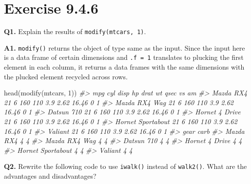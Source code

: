 \documentclass[
]{book}
\newenvironment{Shaded}{\begin{snugshade}}{\end{snugshade}}
\newcommand{\CommentTok}[1]{\textcolor[rgb]{0.56,0.35,0.01}{\textit{#1}}}
\newcommand{\DecValTok}[1]{\textcolor[rgb]{0.00,0.00,0.81}{#1}}
\newcommand{\FunctionTok}[1]{\textcolor[rgb]{0.00,0.00,0.00}{#1}}
\newcommand{\NormalTok}[1]{#1}
\newcommand{\OtherTok}[1]{\textcolor[rgb]{0.56,0.35,0.01}{#1}}
\newcommand{\SpecialCharTok}[1]{\textcolor[rgb]{0.00,0.00,0.00}{#1}}
\newcommand{\StringTok}[1]{\textcolor[rgb]{0.31,0.60,0.02}{#1}}
\begin{document}
\hypertarget{exercise-9.4.6}{%
\section{Exercise 9.4.6}\label{exercise-9.4.6}}

\textbf{Q1.} Explain the results of \texttt{modify(mtcars,\ 1)}.

\textbf{A1.} \texttt{modify()} returns the object of type same as the input. Since the input here is a data frame of certain dimensions and \texttt{.f\ =\ 1} translates to plucking the first element in each column, it returns a data frames with the same dimensions with the plucked element recycled across rows.

\begin{Shaded}
\begin{Highlighting}[]
\FunctionTok{head}\NormalTok{(}\FunctionTok{modify}\NormalTok{(mtcars, }\DecValTok{1}\NormalTok{))}
\CommentTok{\#\textgreater{}                   mpg cyl disp  hp drat   wt  qsec vs am}
\CommentTok{\#\textgreater{} Mazda RX4          21   6  160 110  3.9 2.62 16.46  0  1}
\CommentTok{\#\textgreater{} Mazda RX4 Wag      21   6  160 110  3.9 2.62 16.46  0  1}
\CommentTok{\#\textgreater{} Datsun 710         21   6  160 110  3.9 2.62 16.46  0  1}
\CommentTok{\#\textgreater{} Hornet 4 Drive     21   6  160 110  3.9 2.62 16.46  0  1}
\CommentTok{\#\textgreater{} Hornet Sportabout  21   6  160 110  3.9 2.62 16.46  0  1}
\CommentTok{\#\textgreater{} Valiant            21   6  160 110  3.9 2.62 16.46  0  1}
\CommentTok{\#\textgreater{}                   gear carb}
\CommentTok{\#\textgreater{} Mazda RX4            4    4}
\CommentTok{\#\textgreater{} Mazda RX4 Wag        4    4}
\CommentTok{\#\textgreater{} Datsun 710           4    4}
\CommentTok{\#\textgreater{} Hornet 4 Drive       4    4}
\CommentTok{\#\textgreater{} Hornet Sportabout    4    4}
\CommentTok{\#\textgreater{} Valiant              4    4}
\end{Highlighting}
\end{Shaded}

\textbf{Q2.} Rewrite the following code to use \texttt{iwalk()} instead of \texttt{walk2()}. What are the advantages and disadvantages?

\begin{Shaded}
\end{Shaded}
\end{document}
